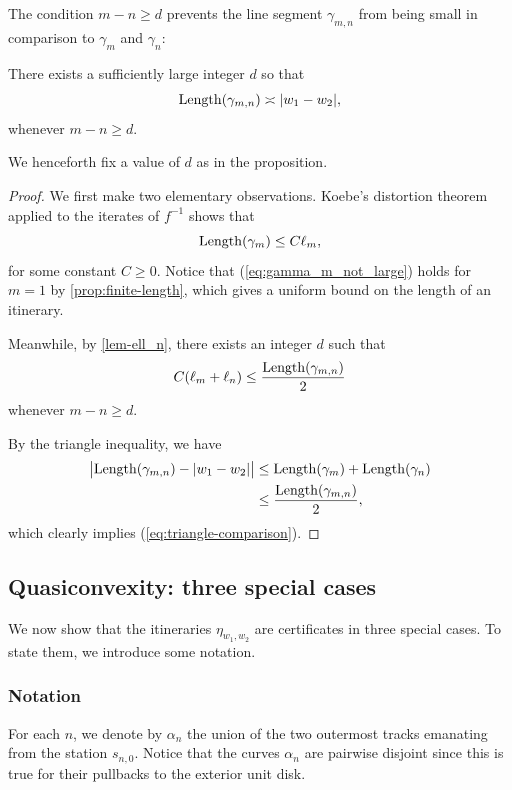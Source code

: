 

The condition $m-n \geq d$ prevents the line segment $\gamma _{m,n}$ from being small in comparison to $\gamma_m$ and $\gamma_n$:
\begin{proposition}
\label {case-3-proof}
There exists a sufficiently large integer $d$ so that 
	\begin{equation}
	\label{eq:triangle-comparison}
		\operatorname{Length}(\gamma_{m,n}) \asymp |w_1-w_2|,
	\end{equation}
	whenever $m-n \geq d$.
\end{proposition}

We henceforth fix a value of $d$ as in the proposition.
\begin{proof}
We first make two elementary observations. Koebe's distortion theorem applied to the iterates of $f^{-1}$ shows that
\begin{equation} \label{eq:gamma_m_not_large}
		\operatorname{Length}(\gamma_m) \leq C \ell_m,
	\end{equation}
for some constant $C \geq 0$. Notice that (\ref{eq:gamma_m_not_large}) holds for $m=1$ by \cref{prop:finite-length}, which gives a uniform bound on the length of an itinerary.

Meanwhile, by \cref{lem-ell_n}, there exists an integer $d$ such that
\begin{align}
C(\ell_m + \ell _n) \leq \frac{\operatorname{Length}(\gamma_{m,n})}{2}
\end{align}
whenever $m-n \geq d$.

By the triangle inequality, we have
\begin{align*} 
		\bigl | \operatorname{Length}(\gamma_{m,n}) - |w_1-w_2| \bigr | & \le \operatorname{Length}(\gamma_m)+\operatorname{Length}(\gamma_n) \\
		& \le \frac{\operatorname{Length}(\gamma_{m,n})}{2},
\end{align*}
which clearly implies (\ref{eq:triangle-comparison}).
\end{proof}

\subsection{Quasiconvexity: three special cases}

We now show that the itineraries $\eta_{w_1,w_2}$ are certificates in three special cases. To state them, we introduce some notation.

\subsubsection{Notation}
For each $n$, we denote by  $\alpha_n$ the union of the two outermost tracks emanating from the station $s_{n,0}$. 
Notice that the curves $\alpha_n$ are pairwise disjoint since this is true for their pullbacks to the exterior unit disk.

